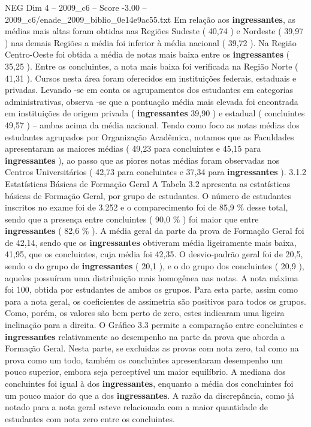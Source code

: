 \begin{textsample}{NEG Dim 4 – 2009\_c6 – Score -3.00 – 2009\_c6/enade\_2009\_biblio\_0e14e9ac55.txt}
Em relação aos \textbf{ingressantes}, as médias mais altas foram obtidas nas Regiões Sudeste ( 40,74 ) e Nordeste ( 39,97 ) nas demais Regiões a média foi inferior à média nacional ( 39,72 ).
Na Região Centro-Oeste foi obtida a média de notas mais baixa entre os \textbf{ingressantes} ( 35,25 ).
Entre os concluintes, a nota mais baixa foi verificada na Região Norte ( 41,31 ).
Cursos nesta área foram oferecidos em instituições federais, estaduais e privadas.
Levando -se em conta os agrupamentos dos estudantes em categorias administrativas, observa -se que a pontuação média mais elevada foi encontrada em instituições de origem privada ( \textbf{ingressantes} 39,90 ) e estadual ( concluintes 49,57 ) – ambas acima da média nacional.
Tendo como foco as notas médias dos estudantes agrupados por Organização Acadêmica, notamos que as Faculdades apresentaram as maiores médias ( 49,23 para concluintes e 45,15 para \textbf{ingressantes} ), ao passo que as piores notas médias foram observadas nos Centros Universitários ( 42,73 para concluintes e 37,34 para \textbf{ingressantes} ). 3.1.2 Estatísticas Básicas de Formação Geral A Tabela 3.2 apresenta as estatísticas básicas de Formação Geral, por grupo de estudantes.
O número de estudantes inscritos no exame foi de 3.252 e o comparecimento foi de 85,9 \% desse total, sendo que a presença entre concluintes ( 90,0 \% ) foi maior que entre \textbf{ingressantes} ( 82,6 \% ).
A média geral da parte da prova de Formação Geral foi de 42,14, sendo que os \textbf{ingressantes} obtiveram média ligeiramente mais baixa, 41,95, que os concluintes, cuja média foi 42,35.
O desvio-padrão geral foi de 20,5, sendo o do grupo de \textbf{ingressantes} ( 20,1 ), e o do grupo dos concluintes ( 20,9 ), aqueles possuíram uma distribuição mais homogênea nas notas.
A nota máxima foi 100, obtida por estudantes de ambos os grupos.
Para esta parte, assim como para a nota geral, os coeficientes de assimetria são positivos para todos os grupos.
Como, porém, os valores são bem perto de zero, estes indicaram uma ligeira inclinação para a direita.
O Gráfico 3.3 permite a comparação entre concluintes e \textbf{ingressantes} relativamente ao desempenho na parte da prova que aborda a Formação Geral.
Nesta parte, se excluidas as provas com nota zero, tal como na prova como um todo, também os concluintes apresentaram desempenho um pouco superior, embora seja perceptível um maior equilíbrio.
A mediana dos concluintes foi igual à dos \textbf{ingressantes}, enquanto a média dos concluintes foi um pouco maior do que a dos \textbf{ingressantes}.
A razão da discrepância, como já notado para a nota geral esteve relacionada com a maior quantidade de estudantes com nota zero entre os concluintes.

\end{textsample}
